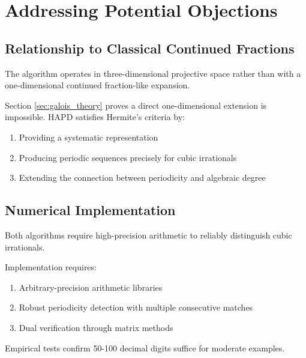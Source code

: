 \section{Addressing Potential Objections}\label{sec:objections}

\subsection{Relationship to Classical Continued Fractions}

\begin{objection}
The \HAPD{} algorithm operates in three-dimensional projective space rather than with a one-dimensional continued fraction-like expansion.
\end{objection}

\begin{response}
Section \ref{sec:galois_theory} proves a direct one-dimensional extension is impossible. HAPD satisfies Hermite's criteria by:
\begin{enumerate}
\item Providing a systematic representation
\item Producing periodic sequences precisely for cubic irrationals
\item Extending the connection between periodicity and algebraic degree
\end{enumerate}
\end{response}

\subsection{Numerical Implementation}

\begin{objection}
Both algorithms require high-precision arithmetic to reliably distinguish cubic irrationals.
\end{objection}

\begin{response}
Implementation requires:
\begin{enumerate}
\item Arbitrary-precision arithmetic libraries
\item Robust periodicity detection with multiple consecutive matches
\item Dual verification through matrix methods
\end{enumerate}
Empirical tests confirm 50-100 decimal digits suffice for moderate examples.
\end{response}

